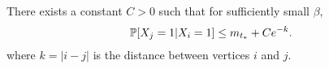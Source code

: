	\begin{lemma}
		There exists a constant $C > 0$ such that for sufficiently small $\beta$,
		\label{lem:nd X_j given X_i}
		\begin{equation}
			\mathbb{P}[X_j = 1| X_i = 1] \leq m_{t_*} + C e^{-k}.
		\end{equation}
		where $k = |i - j|$ is the distance between vertices $i$ and $j$.
	\end{lemma}
